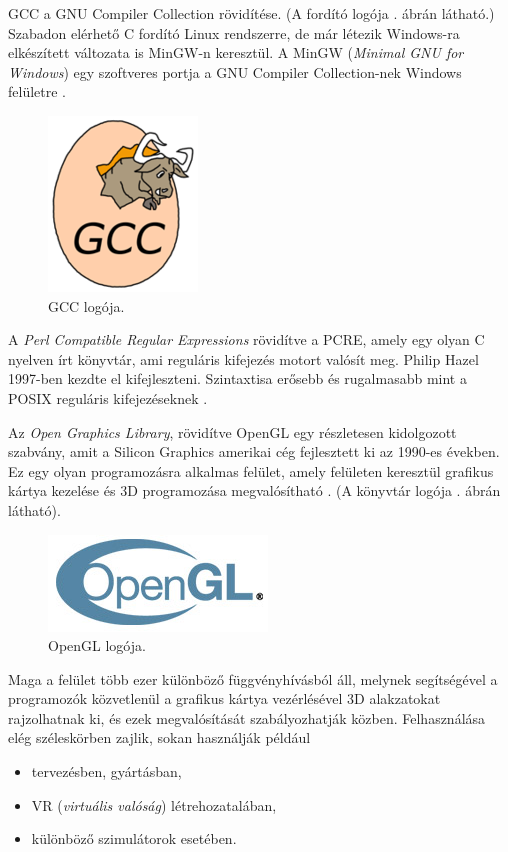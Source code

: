 
GCC a GNU Compiler Collection rövidítése. (A fordító logója . ábrán látható.) Szabadon elérhető C fordító Linux rendszerre, de már létezik Windows-ra elkészített változata is MinGW-n keresztül. A MinGW (\textit{Minimal GNU for Windows}) egy szoftveres portja a GNU Compiler Collection-nek Windows felületre \cite{gnu2003richard}.

\begin{figure}[h]
\centering
\includegraphics[scale=0.6]{images/gcc.png}
\caption{GCC logója.}
\label{fig:gcc}
\end{figure}


A \textit{Perl Compatible Regular Expressions} rövidítve a PCRE, amely egy olyan C nyelven írt könyvtár, ami reguláris kifejezés motort valósít meg. Philip Hazel 1997-ben kezdte el kifejleszteni. Szintaxtisa erősebb és rugalmasabb mint a POSIX reguláris kifejezéseknek \cite{philip1997pcre}.


Az \textit{Open Graphics Library}, rövidítve OpenGL egy részletesen kidolgozott szabvány, amit a Silicon Graphics amerikai cég fejlesztett ki az 1990-es években. Ez egy olyan programozásra alkalmas felület, amely felületen keresztül grafikus kártya kezelése és 3D programozása megvalósítható \cite{mason1999opengl}. (A könyvtár logója . ábrán látható).

\begin{figure}[h]
	\centering
	\includegraphics[scale=0.6]{images/opengl_logo.jpg}
	\caption{OpenGL logója.}
	\label{fig:opengl}
\end{figure}

Maga a felület több ezer különböző függvényhívásból áll, melynek segítségével a programozók közvetlenül a grafikus kártya vezérlésével 3D alakzatokat rajzolhatnak ki, és ezek megvalósítását szabályozhatják közben. Felhasználása elég széleskörben zajlik, sokan használják például
\begin{itemize}
\item tervezésben, gyártásban, 
\item VR (\textit{virtuális valóság}) létrehozatalában,
\item különböző szimulátorok esetében.
\end{itemize}

